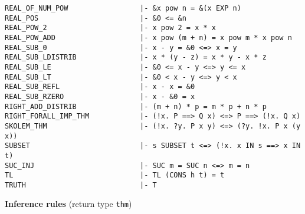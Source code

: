 \documentclass{llncs}
\begin{document}
\begin{verbatim}
REAL_OF_NUM_POW                 |- &x pow n = &(x EXP n)
REAL_POS                        |- &0 <= &n
REAL_POW_2                      |- x pow 2 = x * x
REAL_POW_ADD                    |- x pow (m + n) = x pow m * x pow n
REAL_SUB_0                      |- x - y = &0 <=> x = y
REAL_SUB_LDISTRIB               |- x * (y - z) = x * y - x * z
REAL_SUB_LE                     |- &0 <= x - y <=> y <= x
REAL_SUB_LT                     |- &0 < x - y <=> y < x
REAL_SUB_REFL                   |- x - x = &0
REAL_SUB_RZERO                  |- x - &0 = x
RIGHT_ADD_DISTRIB               |- (m + n) * p = m * p + n * p
RIGHT_FORALL_IMP_THM            |- (!x. P ==> Q x) <=> P ==> (!x. Q x)
SKOLEM_THM                      |- (!x. ?y. P x y) <=> (?y. !x. P x (y x))
SUBSET                          |- s SUBSET t <=> (!x. x IN s ==> x IN t)
SUC_INJ                         |- SUC m = SUC n <=> m = n
TL                              |- TL (CONS h t) = t
TRUTH                           |- T
\end{verbatim}
\endgroup

\newpage

\textbf{Inference rules} (return type \verb^thm^)
\end{document}
